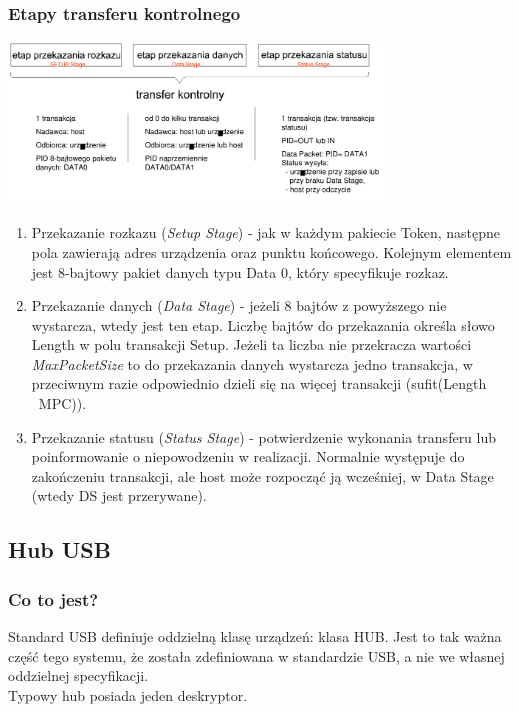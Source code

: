 	\subsubsection{Etapy transferu kontrolnego}
	\includegraphics[width=10cm]{./wyklady/USB_31_1.pdf}
	\begin{enumerate}
		\item Przekazanie rozkazu (\emph{Setup Stage}) - jak w każdym pakiecie Token, następne pola zawierają adres urządzenia oraz punktu końcowego. Kolejnym elementem jest 8-bajtowy pakiet danych typu Data 0, który specyfikuje rozkaz.
		\item Przekazanie danych (\emph{Data Stage}) - jeżeli 8 bajtów z powyższego nie wystarcza, wtedy jest ten etap. Liczbę bajtów do przekazania określa słowo Length w polu transakcji Setup. Jeżeli ta liczba nie przekracza wartości \emph{MaxPacketSize} to do przekazania danych wystarcza jedno transakcja, w przeciwnym razie odpowiednio dzieli się na więcej transakcji (sufit(Length \ MPC)).
		\item Przekazanie statusu (\emph{Status Stage}) - potwierdzenie wykonania transferu lub poinformowanie o niepowodzeniu w realizacji. Normalnie występuje do zakończeniu transakcji, ale host może rozpocząć ją wcześniej, w Data Stage (wtedy DS jest przerywane).
	\end{enumerate}
	
\subsection{Hub USB}
	\subsubsection{Co to jest?}
	Standard USB definiuje oddzielną klasę urządzeń: klasa HUB. Jest to tak ważna część tego systemu, że została zdefiniowana w standardzie USB, a nie we własnej oddzielnej specyfikacji.\\
	Typowy hub posiada jeden deskryptor.
